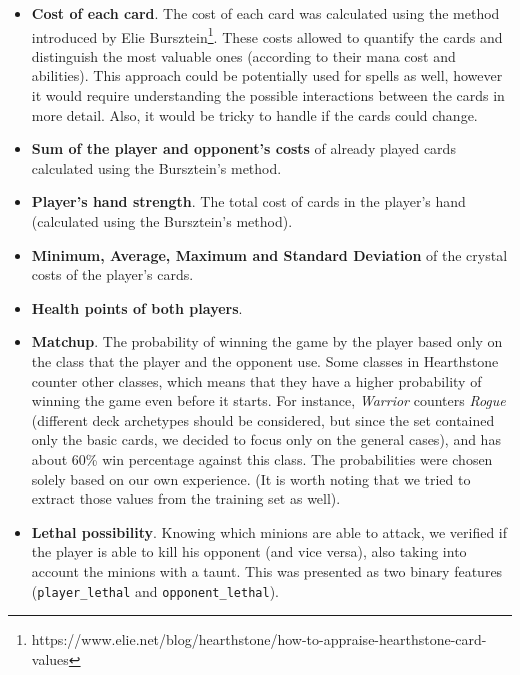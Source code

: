 \documentclass{svproc}
\begin{document}
\begin{itemize}
  \item \textbf{Cost of each card}. The cost of each card was calculated using the method introduced by Elie Bursztein\footnote{https://www.elie.net/blog/hearthstone/how-to-appraise-hearthstone-card-values}. These costs allowed to quantify the cards and distinguish the most valuable ones (according to their mana cost and abilities). This approach could be potentially used for spells as well, however it would require understanding the possible interactions between the cards in more detail. Also, it would be tricky to handle if the cards could change.
  \item \textbf{Sum of the player and opponent's costs} of already played cards calculated using the Bursztein's method.
  \item \textbf{Player's hand strength}. The total cost of cards in the player's hand (calculated using the Bursztein's method).
  \item \textbf{Minimum, Average, Maximum and Standard Deviation} of the crystal costs of the player's cards.
  \item \textbf{Health points of both players}.
  \item \textbf{Matchup}. The probability of winning the game by the player based only on the class that the player and the opponent use. Some classes in Hearthstone counter other classes, which means that they have a higher probability of winning the game even before it starts. For instance, \emph{Warrior} counters \emph{Rogue} (different deck archetypes should be considered, but since the set contained only the basic cards, we decided to focus only on the general cases), and has about 60\% win percentage against this class. The probabilities were chosen solely based on our own experience. (It is worth noting that we tried to extract those values from the training set as well).
 \item \textbf{Lethal possibility}. Knowing which minions are able to attack, we verified if the player is able to kill his opponent (and vice versa), also taking into account the minions with a taunt. This was presented as two binary features (\texttt{player\_lethal} and \texttt{opponent\_lethal}).
\end{itemize}
\end{document}
